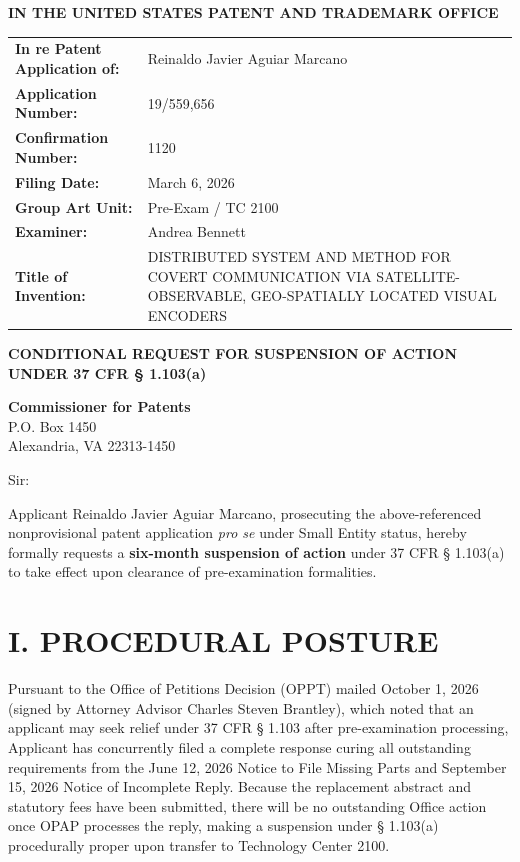 \documentclass[11pt,letterpaper]{article}
\begin{document}
\thispagestyle{empty}

\begin{center}
    \large\textbf{IN THE UNITED STATES PATENT AND TRADEMARK OFFICE} \\
\end{center}

\vspace{0.2cm}
\noindent\begin{tabular}{p{2.3in}p{4.0in}}
\textbf{In re Patent Application of:} & Reinaldo Javier Aguiar Marcano \\
\textbf{Application Number:} & 19/559,656 \\
\textbf{Confirmation Number:} & 1120 \\
\textbf{Filing Date:} & March 6, 2026 \\
\textbf{Group Art Unit:} & Pre-Exam / TC 2100 \\
\textbf{Examiner:} & Andrea Bennett \\
\textbf{Title of Invention:} & DISTRIBUTED SYSTEM AND METHOD FOR COVERT COMMUNICATION VIA SATELLITE-OBSERVABLE, GEO-SPATIALLY LOCATED VISUAL ENCODERS \\
\end{tabular}

\vspace{0.4cm}
\begin{center}
    \textbf{\large CONDITIONAL REQUEST FOR SUSPENSION OF ACTION \\
    UNDER 37 CFR \S{} 1.103(a)}
\end{center}

\vspace{0.2cm}
\noindent\textbf{Commissioner for Patents} \\
\noindent P.O. Box 1450 \\
\noindent Alexandria, VA 22313-1450

\vspace{0.2cm}
\noindent Sir:

Applicant Reinaldo Javier Aguiar Marcano, prosecuting the above-referenced nonprovisional patent application \textit{pro se} under Small Entity status, hereby formally requests a \textbf{six-month suspension of action} under 37 CFR \S{} 1.103(a) to take effect upon clearance of pre-examination formalities.

\section*{I. PROCEDURAL POSTURE}

Pursuant to the Office of Petitions Decision (OPPT) mailed October 1, 2026 (signed by Attorney Advisor Charles Steven Brantley), which noted that an applicant may seek relief under 37 CFR \S{} 1.103 after pre-examination processing, Applicant has concurrently filed a complete response curing all outstanding requirements from the June 12, 2026 Notice to File Missing Parts and September 15, 2026 Notice of Incomplete Reply. Because the replacement abstract and statutory fees have been submitted, there will be no outstanding Office action once OPAP processes the reply, making a suspension under \S{} 1.103(a) procedurally proper upon transfer to Technology Center 2100.
\end{document}
